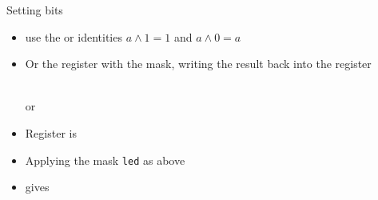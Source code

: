 \documentclass[svgnames,x11names]{beamer}
\begin{document}
\begin{frame}[fragile]{Setting bits}
  \begin{itemize}
  \item use the \alert{or} identities $a \wedge 1 = 1$ and $a \wedge 0 = a$
  \item Or the register with the mask, writing the result back into the register
    \begin{minipage}{0.8\linewidth}
      \begin{block}{}
      \end{block}
    \end{minipage}\\
  or\\
  \begin{minipage}{0.8\linewidth}
    \begin{block}{}
    \end{block}
  \end{minipage}
  \end{itemize}

  \begin{example}
    \begin{itemize}
    \item 
    Register is
    \item Applying the mask \texttt{led} as above
    \item  gives 
    \end{itemize}
  \end{example}
\end{frame}
\end{document}
